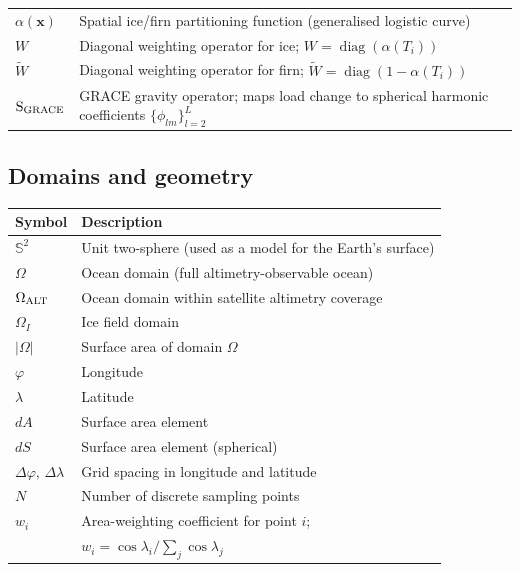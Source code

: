 \begin{longtable}{@{}lp{10cm}@{}}
    $\alpha(\mathbf{x})$                    & Spatial ice/firn partitioning function (generalised logistic curve) \\
    $W$                                     & Diagonal weighting operator for ice; $W = \operatorname{diag}(\alpha(T_i))$ \\
    $\tilde{W}$                             & Diagonal weighting operator for firn; $\tilde{W} = \operatorname{diag}(1-\alpha(T_i))$ \\
    $\operatorname{{S}}_{{\mathrm{GRACE}}}$                        & GRACE gravity operator; maps load change to spherical harmonic coefficients $\{\phi_{lm}\}_{l=2}^{L}$ \\
    \bottomrule
\end{longtable}

\vspace{1em}

\subsection*{Domains and geometry}

\begin{longtable}{@{}lp{10cm}@{}}
    \toprule
    \textbf{Symbol} & \textbf{Description} \\
    \midrule
    $\mathbb{S}^2$              & Unit two-sphere (used as a model for the Earth's surface) \\
    $\Omega$                    & Ocean domain (full altimetry-observable ocean) \\
    $\Omega_{\mathrm{ALT}}$       & Ocean domain within satellite altimetry coverage \\
    $\Omega_I$                  & Ice field domain \\
    $|\Omega|$                  & Surface area of domain $\Omega$ \\
    $\varphi$                   & Longitude \\
    $\lambda$                   & Latitude \\
    $dA$                        & Surface area element \\
    $dS$                        & Surface area element (spherical) \\
    $\Delta\varphi,\,\Delta\lambda$ & Grid spacing in longitude and latitude \\
    $N$                         & Number of discrete sampling points \\
    $w_i$                       & Area-weighting coefficient for point $i$;\\&$w_i = \cos\lambda_i / \sum_j \cos\lambda_j$ \\
    \bottomrule
\end{longtable}

